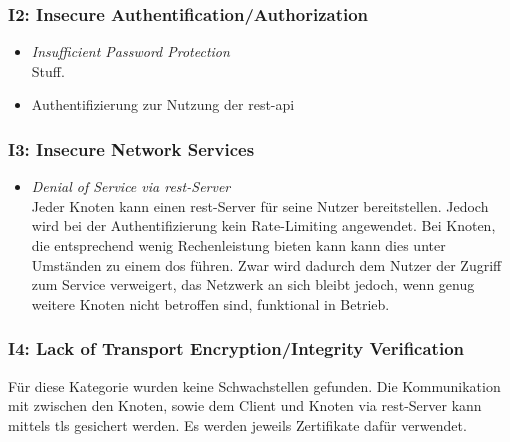         \subsubsection*{I2: Insecure Authentification/Authorization}
            \begin{itemize}[leftmargin=0cm,label={}]
                \item \emph{Insufficient Password Protection}\label{vuln:prototype_pwdprot}\\
        	        Stuff.
    	        \item Authentifizierung zur Nutzung der \gls{rest}-\gls{api}
            \end{itemize}
            
        \subsubsection*{I3: Insecure Network Services}
            \begin{itemize}[leftmargin=0cm,label={}]
                \item \emph{Denial of Service via \gls{rest}-Server}\label{vuln:prototype_dos}\\
        	        Jeder Knoten kann einen \gls{rest}-Server für seine Nutzer bereitstellen. 
        	        Jedoch wird bei der Authentifizierung kein Rate-Limiting angewendet. 
        	        Bei Knoten, die entsprechend wenig Rechenleistung bieten kann kann dies unter Umständen zu einem \gls{dos} führen. 
        	        Zwar wird dadurch dem Nutzer der Zugriff zum Service verweigert, das Netzwerk an sich bleibt jedoch, wenn genug weitere Knoten nicht betroffen sind, funktional in Betrieb.
            \end{itemize}
            
        \subsubsection*{I4: Lack of Transport Encryption/Integrity Verification}
            Für diese Kategorie wurden keine Schwachstellen gefunden. 
            Die Kommunikation mit zwischen den Knoten, sowie dem Client und Knoten via \gls{rest}-Server kann mittels \gls{tls} gesichert werden. 
            Es werden jeweils Zertifikate dafür verwendet.
            
